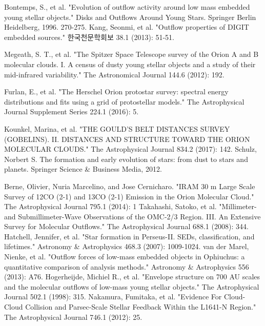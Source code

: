 \documentclass[twoside,11pt]{gshs_thesis}
\begin{document}
\clearpage
\begin{thebibliography}{99}\begin{onehalfspace}


 Bontemps, S., et al. "Evolution of outflow activity around low mass embedded young stellar objects." Disks and Outflows Around Young Stars. Springer Berlin Heidelberg, 1996. 270-275.
 Kang, Seonmi, et al. "Outflow properties of DIGIT embedded sources." 한국천문학회보 38.1 (2013): 51-51.

Megeath, S. T., et al. "The Spitzer Space Telescope survey of the Orion A and B molecular clouds. I. A census of dusty young stellar objects and a study of their mid-infrared variability." The Astronomical Journal 144.6 (2012): 192.

 Furlan, E., et al. "The Herschel Orion protostar survey: spectral energy distributions and fits using a grid of protostellar models." The Astrophysical Journal Supplement Series 224.1 (2016): 5.

Kounkel, Marina, et al. "THE GOULD’S BELT DISTANCES SURVEY (GOBELINS). II. DISTANCES AND STRUCTURE TOWARD THE ORION MOLECULAR CLOUDS." The Astrophysical Journal 834.2 (2017): 142.
 Schulz, Norbert S. The formation and early evolution of stars: from dust to stars and planets. Springer Science \& Business Media, 2012.

Berne, Olivier, Nuria Marcelino, and Jose Cernicharo. "IRAM 30 m Large Scale Survey of 12CO (2-1) and 13CO (2-1) Emission in the Orion Molecular Cloud." The Astrophysical Journal 795.1 (2014): 1
Takahashi, Satoko, et al. "Millimeter-and Submillimeter-Wave Observations of the OMC-2/3 Region. III. An Extensive Survey for Molecular Outflows." The Astrophysical Journal 688.1 (2008): 344.
 Hatchell, Jennifer, et al. "Star formation in Perseus-II. SEDs, classification, and lifetimes." Astronomy \& Astrophysics 468.3 (2007): 1009-1024.
 van der Marel, Nienke, et al. "Outflow forces of low-mass embedded objects in Ophiuchus: a quantitative comparison of analysis methods." Astronomy \& Astrophysics 556 (2013): A76.
Hogerheijde, Michiel R., et al. "Envelope structure on 700 AU scales and the molecular outflows of low-mass young stellar objects." The Astrophysical Journal 502.1 (1998): 315.
 Nakamura, Fumitaka, et al. "Evidence For Cloud-Cloud Collision and Parsec-Scale Stellar Feedback Within the L1641-N Region." The Astrophysical Journal 746.1 (2012): 25.


\end{onehalfspace}
\end{thebibliography}
\end{document}

